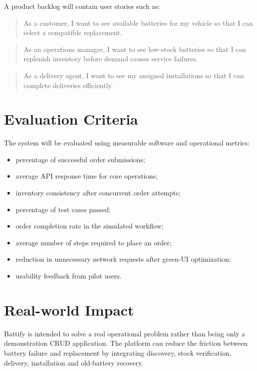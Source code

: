 \documentclass[11pt,a4paper]{article}
\begin{document}
A product backlog will contain user stories such as:

\begin{quote}
As a customer, I want to see available batteries for my vehicle so that I
can select a compatible replacement.
\end{quote}

\begin{quote}
As an operations manager, I want to see low-stock batteries so that I can
replenish inventory before demand causes service failures.
\end{quote}

\begin{quote}
As a delivery agent, I want to see my assigned installations so that I can
complete deliveries efficiently.
\end{quote}

\section{Evaluation Criteria}

The system will be evaluated using measurable software and operational
metrics:

\begin{itemize}[leftmargin=0.7cm]
    \item percentage of successful order submissions;
    \item average API response time for core operations;
    \item inventory consistency after concurrent order attempts;
    \item percentage of test cases passed;
    \item order completion rate in the simulated workflow;
    \item average number of steps required to place an order;
    \item reduction in unnecessary network requests after green-UI
    optimization;
    \item usability feedback from pilot users.
\end{itemize}

\section{Real-world Impact}

Battify is intended to solve a real operational problem rather than being
only a demonstration CRUD application. The platform can reduce the friction
between battery failure and replacement by integrating discovery, stock
verification, delivery, installation and old-battery recovery.
\end{document}
